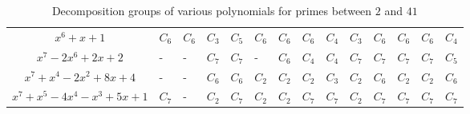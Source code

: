 \documentclass{article}
\begin{document}
\begin{table}[hp]
\begin{center}
\begin{tabular}{|c|lllllllllllll|}
$ x^6 + x + 1 $                    & $C_6$ & $C_6$ & $C_3$ & $C_5$ & $C_6$ & $C_6$ & $C_6$ & $C_4$ & $C_3$ & $C_6$ & $C_6$ & $C_6$ & $C_4$ \\
$ x^7 - 2x^6 + 2x + 2 $            & -   & -   & $C_7$ & $C_7$ & -   & $C_6$ & $C_4$ & $C_4$ & $C_7$ & $C_7$ & $C_7$ & $C_7$ & $C_5$ \\
$ x^7 + x^4 - 2x^2 + 8x + 4 $      & -   & -   & $C_6$ & $C_6$ & $C_2$ & $C_2$ & $C_2$ & $C_3$ & $C_2$ & $C_6$ & $C_2$ & $C_2$ & $C_6$ \\
$ x^7 + x^5 - 4x^4 - x^3 + 5x + 1$ & $C_7$ & -   & $C_2$ & $C_7$ & $C_2$ & $C_2$ & $C_7$ & $C_7$ & $C_2$ & $C_7$ & $C_7$ & $C_7$ & $C_7$ \\ \hline
\end{tabular}
\caption{ Decomposition groups of various polynomials for primes between $2$ and $41$}
\end{center}
\end{table}
\newpage
\end{document}
